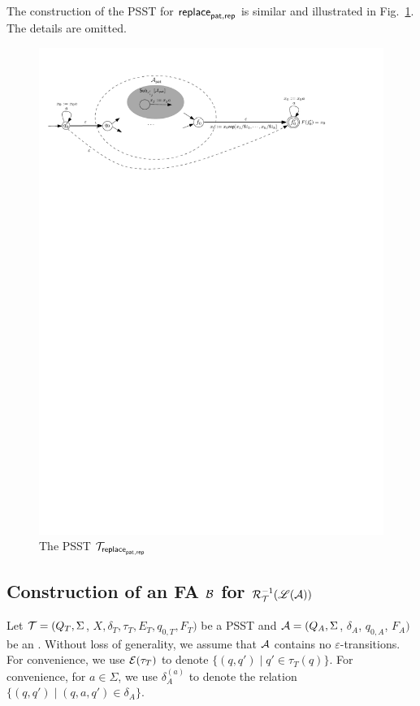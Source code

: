 The construction of the PSST for $\mathsf{replace}_{\mathsf{pat}, \mathsf{rep}}$ is similar and illustrated in Fig.~\ref{fig-psst-replace}. The details are omitted.
	\begin{figure}[ht]
		\centering
		\includegraphics[width=\textwidth]{psst-replace.pdf}
		\caption{The PSST $\mathcal{T}_{\mathsf{replace}_{\mathsf{pat},\mathsf{rep}}}$}
		\label{fig-psst-replace}
	\end{figure}
	

\subsection{Construction of an FA $\mathcal{B}$ for $\mathcal{R}^{-1}_{\mathcal{T}}(\mathscr{L}(\mathcal{A}))$}\label{app-pre-image}


Let $\mathcal{T} = (Q_T, \Sigma$, $X, \delta_T, \tau_T, E_T,  q_{0, T}, F_T)$ be a PSST  and $\mathcal{A}
  = (Q_A, \Sigma$, $\delta_A$, $q_{0, A}$, $F_A)$ be an \FA{}. Without loss of generality, we assume that $\mathcal{A}$ contains no $\varepsilon$-transitions. For convenience, we use $\mathcal{E}(\tau_T)$ to denote $\{(q, q') \mid q' \in \tau_T(q)\}$. For convenience, for $a \in \Sigma$, we use $\delta^{(a)}_A$ to denote the  relation $\{(q, q') \mid (q, a, q') \in \delta_A\}$.

